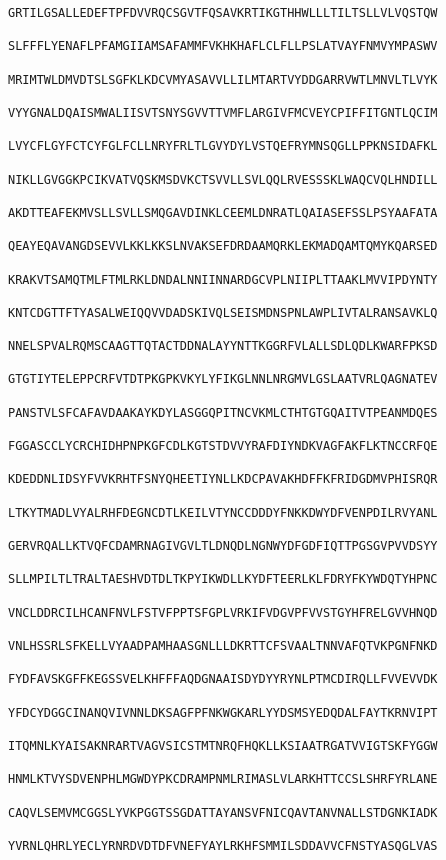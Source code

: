 \documentclass[en,black,10pt,normal]{elegantnote}
\begin{document}
\begin{lstlisting}[frame=single]
GRTILGSALLEDEFTPFDVVRQCSGVTFQSAVKRTIKGTHHWLLLTILTSLLVLVQSTQW

SLFFFLYENAFLPFAMGIIAMSAFAMMFVKHKHAFLCLFLLPSLATVAYFNMVYMPASWV

MRIMTWLDMVDTSLSGFKLKDCVMYASAVVLLILMTARTVYDDGARRVWTLMNVLTLVYK

VYYGNALDQAISMWALIISVTSNYSGVVTTVMFLARGIVFMCVEYCPIFFITGNTLQCIM

LVYCFLGYFCTCYFGLFCLLNRYFRLTLGVYDYLVSTQEFRYMNSQGLLPPKNSIDAFKL

NIKLLGVGGKPCIKVATVQSKMSDVKCTSVVLLSVLQQLRVESSSKLWAQCVQLHNDILL

AKDTTEAFEKMVSLLSVLLSMQGAVDINKLCEEMLDNRATLQAIASEFSSLPSYAAFATA

QEAYEQAVANGDSEVVLKKLKKSLNVAKSEFDRDAAMQRKLEKMADQAMTQMYKQARSED

KRAKVTSAMQTMLFTMLRKLDNDALNNIINNARDGCVPLNIIPLTTAAKLMVVIPDYNTY

KNTCDGTTFTYASALWEIQQVVDADSKIVQLSEISMDNSPNLAWPLIVTALRANSAVKLQ

NNELSPVALRQMSCAAGTTQTACTDDNALAYYNTTKGGRFVLALLSDLQDLKWARFPKSD

GTGTIYTELEPPCRFVTDTPKGPKVKYLYFIKGLNNLNRGMVLGSLAATVRLQAGNATEV

PANSTVLSFCAFAVDAAKAYKDYLASGGQPITNCVKMLCTHTGTGQAITVTPEANMDQES

FGGASCCLYCRCHIDHPNPKGFCDLKGTSTDVVYRAFDIYNDKVAGFAKFLKTNCCRFQE

KDEDDNLIDSYFVVKRHTFSNYQHEETIYNLLKDCPAVAKHDFFKFRIDGDMVPHISRQR

LTKYTMADLVYALRHFDEGNCDTLKEILVTYNCCDDDYFNKKDWYDFVENPDILRVYANL

GERVRQALLKTVQFCDAMRNAGIVGVLTLDNQDLNGNWYDFGDFIQTTPGSGVPVVDSYY

SLLMPILTLTRALTAESHVDTDLTKPYIKWDLLKYDFTEERLKLFDRYFKYWDQTYHPNC

VNCLDDRCILHCANFNVLFSTVFPPTSFGPLVRKIFVDGVPFVVSTGYHFRELGVVHNQD

VNLHSSRLSFKELLVYAADPAMHAASGNLLLDKRTTCFSVAALTNNVAFQTVKPGNFNKD

FYDFAVSKGFFKEGSSVELKHFFFAQDGNAAISDYDYYRYNLPTMCDIRQLLFVVEVVDK

YFDCYDGGCINANQVIVNNLDKSAGFPFNKWGKARLYYDSMSYEDQDALFAYTKRNVIPT

ITQMNLKYAISAKNRARTVAGVSICSTMTNRQFHQKLLKSIAATRGATVVIGTSKFYGGW

HNMLKTVYSDVENPHLMGWDYPKCDRAMPNMLRIMASLVLARKHTTCCSLSHRFYRLANE

CAQVLSEMVMCGGSLYVKPGGTSSGDATTAYANSVFNICQAVTANVNALLSTDGNKIADK

YVRNLQHRLYECLYRNRDVDTDFVNEFYAYLRKHFSMMILSDDAVVCFNSTYASQGLVAS


\end{lstlisting}
\end{document}
